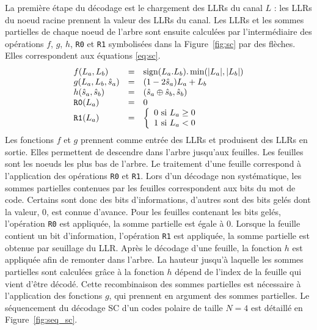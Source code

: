 La première étape du décodage est le chargement des LLRs du canal $L$ : les LLRs du noeud racine prennent la valeur des LLRs du canal. Les LLRs et les sommes partielles de chaque noeud de l'arbre sont ensuite calculées par l'intermédiaire des opérations $f$, $g$, $h$, \texttt{R0} et \texttt{R1} symbolisées dans la Figure~\ref{fig:sc} par des flèches. Elles correspondent aux équations \ref{eq:sc}. 
    \begin{eqnarray}
      \begin{array}{l c l}
        f(L_a,L_b) &=& \text{sign}(L_a.L_b).\min(|L_a|,|L_b|)\\
        g(L_a,L_b,\hat{s}_a)&=&(1-2\hat{s}_a)L_a+L_b\\
        h(\hat{s}_a,\hat{s}_b)&=& (\hat{s}_{a} \oplus \hat{s}_{b}, \hat{s}_{b})\\
        \texttt{R0}(L_a) &=& 0 \\
        \texttt{R1}(L_a) &=&  \left\{\begin{array}{l c l} 0 \text{ si } L_a \geq 0 \\ 1 \text{ si } L_a < 0 \end{array}\right.
      \end{array}
      \label{eq:sc}
    \end{eqnarray}
Les fonctions $f$ et $g$ prennent comme entrée des LLRs et produisent des LLRs en sortie. Elles permettent de descendre dans l'arbre jusqu'aux feuilles. Les feuilles sont les noeuds les plus bas de l'arbre. Le traitement d'une feuille correspond à l'application des opérations \texttt{R0} et \texttt{R1}. Lors d'un décodage non systématique, les sommes partielles contenues par les feuilles correspondent aux bits du mot de code. Certains sont donc des bits d'informations, d'autres sont des bits gelés dont la valeur, $0$, est connue d'avance. Pour les feuilles contenant les bits gelés, l'opération \texttt{R0} est appliquée, la somme partielle est égale à 0. Lorsque la feuille contient un bit d'information, l'opération \texttt{R1} est appliquée, la somme partielle est obtenue par seuillage du LLR. Après le décodage d'une feuille, la fonction $h$ est appliquée afin de remonter dans l'arbre. La hauteur jusqu'à laquelle les sommes partielles sont calculées grâce à la fonction $h$ dépend de l'index de la feuille qui vient d'être décodé. Cette recombinaison des sommes partielles est nécessaire à l'application des fonctions $g$, qui prennent en argument des sommes partielles. Le séquencement du décodage SC d'un codes polaire de taille $N=4$ est détaillé en Figure~\ref{fig:seq_sc}.

